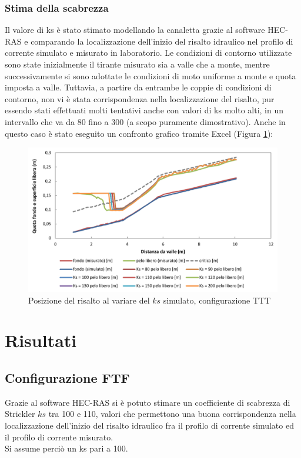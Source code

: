\documentclass[12pt]{article} %
\begin{document}
\subsubsection{Stima della scabrezza}
\noindent Il valore di ks è stato stimato modellando la canaletta grazie al software HEC-RAS e comparando la localizzazione dell’inizio del risalto idraulico nel profilo di corrente simulato e misurato in laboratorio. Le condizioni di contorno utilizzate sono state inizialmente il tirante misurato sia a valle che a monte, mentre successivamente si sono adottate le condizioni di moto uniforme a monte e quota imposta a valle. Tuttavia, a partire da entrambe le coppie di condizioni di contorno, non vi è stata corrispondenza nella localizzazione del risalto, pur essendo stati effettuati molti tentativi anche con valori di ks molto alti, in un intervallo che va da 80 fino a 300 (a scopo puramente dimostrativo). Anche in questo caso è stato eseguito un confronto grafico tramite Excel (Figura \ref{fig:risalto_TTT}):

\begin{figure}[H]
    \centering
    \includegraphics[width=\textwidth]{TTTrisalto6.5.png}
    \caption{Posizione del risalto al variare del $ks$ simulato, configurazione TTT}
    \label{fig:risalto_TTT}
\end{figure}
\newpage
\section{Risultati}
\subsection{Configurazione FTF}
\noindent Grazie al software HEC-RAS si è potuto stimare un coefficiente di scabrezza di Strickler $ks$ tra 100 e 110, valori che permettono una buona corrispondenza nella localizzazione dell’inizio del risalto idraulico fra il profilo di corrente simulato ed il profilo di corrente misurato. \\
Si assume perciò un ks pari a 100.
\end{document}
